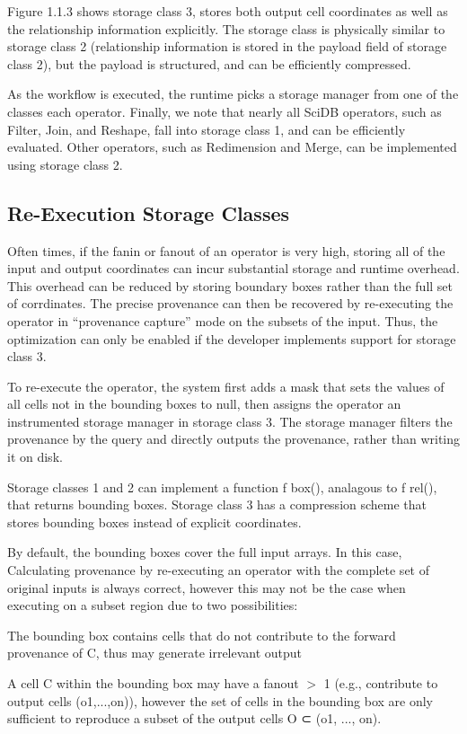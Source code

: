 Figure 1.1.3 shows storage class 3, stores both output cell coordinates as well as the relationship information explicitly. The storage class is physically similar to storage class 2 (relationship information is stored in the payload field of storage class 2), but the payload is structured, and can be efficiently compressed.

As the workflow is executed, the runtime picks a storage manager from one of the classes each operator.
Finally, we note that nearly all SciDB operators, such as Filter, Join, and Reshape, fall into storage class 1, and can be efficiently evaluated. Other operators, such as Redimension and Merge, can be implemented using storage class 2.


\subsection{Re-Execution Storage Classes}

Often times, if the fanin or fanout of an operator is very high, storing all of the input and output coordinates can incur substantial storage and runtime overhead. This overhead can be reduced by storing boundary boxes rather than the full set of corrdinates. The precise provenance can then be recovered by re-executing the operator in “provenance capture” mode on the subsets of the input. Thus, the optimization can only be enabled if the developer implements support for storage class 3.

To re-execute the operator, the system first adds a mask that sets the values of all cells not in the bounding boxes to null, then assigns the operator an instrumented storage manager in storage class 3. The storage manager filters the provenance by the query and directly outputs the provenance, rather than writing it on disk.

Storage classes 1 and 2 can implement a function f box(), analagous to f rel(), that returns bounding boxes. Storage class 3 has a compression scheme that stores bounding boxes instead of explicit coordinates.

By default, the bounding boxes cover the full input arrays. In this case, Calculating provenance by re-executing an operator with the complete set of original inputs is always correct, however this may not be the case when executing on a subset region due to two possibilities:

\begin{CompactEnumerate}
\item The bounding box contains cells that do not contribute to the forward provenance of C, thus may generate irrelevant output
\item A cell C within the bounding box may have a fanout $>$ 1 (e.g., contribute to output cells (o1,...,on)), however the set of cells in the bounding box are only sufficient to reproduce a subset of the output cells O ⊂ (o1, ..., on).
\end{CompactEnumerate}

